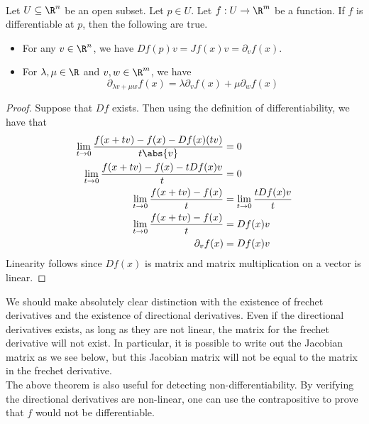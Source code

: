 \documentclass[a4paper]{article}
\begin{document}
\begin{prp}{}{}\\
Let $U\subseteq\R^n$ be an open subset. Let $p\in U$. Let $f:U\to\R^m$ be a function. If $f$ is differentiable at $p$, then the following are true. 
\begin{itemize}
\item For any $v\in\R^n$, we have $Df(p)v=Jf(x)v=\partial_vf(x)$. 
\item For $\lambda,\mu\in\R$ and $v,w\in\R^m$, we have $$\partial_{\lambda v+\mu w}f(x)=\lambda\partial_vf(x)+\mu\partial_wf(x)$$
\end{itemize}
\begin{proof}
Suppose that $Df$ exists. Then using the definition of differentiability, we have that 
\begin{align*}
\lim_{t\to 0}\frac{f(x+tv)-f(x)-Df(x)(tv)}{t\abs{v}}&=0\\
\lim_{t\to 0}\frac{f(x+tv)-f(x)-tDf(x)v}{t}&=0\\
\lim_{t\to 0}\frac{f(x+tv)-f(x)}{t}&=\lim_{t\to 0}\frac{tDf(x)v}{t}\\
\lim_{t\to 0}\frac{f(x+tv)-f(x)}{t}&=Df(x)v\\
\partial_vf(x)&=Df(x)v
\end{align*}
Linearity follows since $Df(x)$ is matrix and matrix multiplication on a vector is linear. 
\end{proof}
\end{prp}

We should make absolutely clear distinction with the existence of frechet derivatives and the existence of directional derivatives. Even if the directional derivatives exists, as long as they are not linear, the matrix for the frechet derivative will not exist. In particular, it is possible to write out the Jacobian matrix as we see below, but this Jacobian matrix will not be equal to the matrix in the frechet derivative. \\

The above theorem is also useful for detecting non-differentiability. By verifying the directional derivatives are non-linear, one can use the contrapositive to prove that $f$ would not be differentiable. 
\end{document}
